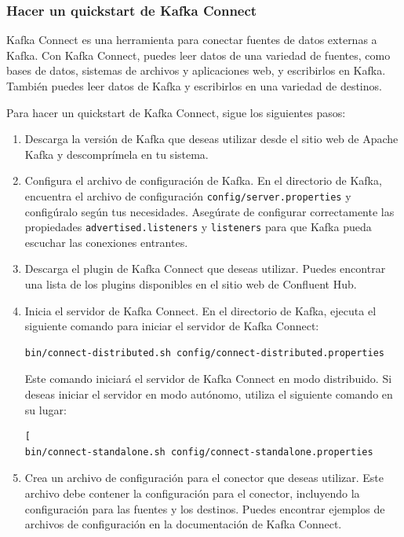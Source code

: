 \documentclass{article}
\begin{document}
\subsubsection{Hacer un quickstart de Kafka Connect}

Kafka Connect es una herramienta para conectar fuentes de datos externas a Kafka. Con Kafka Connect, puedes leer datos de una variedad de fuentes, como bases de datos, sistemas de archivos y aplicaciones web, y escribirlos en Kafka. También puedes leer datos de Kafka y escribirlos en una variedad de destinos.

Para hacer un quickstart de Kafka Connect, sigue los siguientes pasos:

\begin{enumerate}
\item Descarga la versión de Kafka que deseas utilizar desde el sitio web de Apache Kafka y descomprímela en tu sistema.
\item Configura el archivo de configuración de Kafka. En el directorio de Kafka, encuentra el archivo de configuración \lstinline{config/server.properties} y configúralo según tus necesidades. Asegúrate de configurar correctamente las propiedades \lstinline{advertised.listeners} y \lstinline{listeners} para que Kafka pueda escuchar las conexiones entrantes.

\item Descarga el plugin de Kafka Connect que deseas utilizar. Puedes encontrar una lista de los plugins disponibles en el sitio web de Confluent Hub.

\item Inicia el servidor de Kafka Connect. En el directorio de Kafka, ejecuta el siguiente comando para iniciar el servidor de Kafka Connect:
\begin{lstlisting}[numbers=none]
bin/connect-distributed.sh config/connect-distributed.properties\end{lstlisting}
Este comando iniciará el servidor de Kafka Connect en modo distribuido. Si deseas iniciar el servidor en modo autónomo, utiliza el siguiente comando en su lugar:
\begin{lstlisting}[numbers=none][
bin/connect-standalone.sh config/connect-standalone.properties\end{lstlisting}
\item Crea un archivo de configuración para el conector que deseas utilizar. Este archivo debe contener la configuración para el conector, incluyendo la configuración para las fuentes y los destinos. Puedes encontrar ejemplos de archivos de configuración en la documentación de Kafka Connect.


\end{enumerate}
\end{document}
